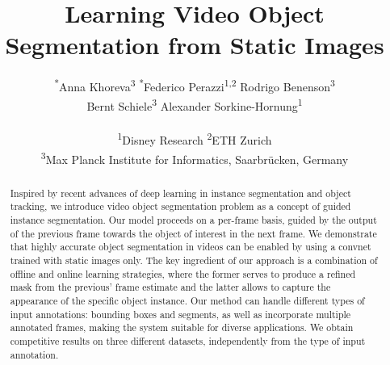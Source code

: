 \documentclass[10pt,twocolumn,letterpaper]{article}
\begin{document}
\title{Learning Video Object Segmentation from Static Images}







\author{
	\textsuperscript{*}Anna Khoreva\textsuperscript{3}\hspace{1.0em}
	\textsuperscript{*}Federico Perazzi\textsuperscript{1,2}\hspace{1.0em}
	Rodrigo Benenson\textsuperscript{3}\hspace{1.0em} \\
	Bernt Schiele\textsuperscript{3}\hspace{1.0em}
	Alexander Sorkine-Hornung\textsuperscript{1}
	\\\\
	\textsuperscript{1}Disney Research \hspace{1.0em} \textsuperscript{2}ETH Zurich\\
	\textsuperscript{3}Max Planck Institute for Informatics, Saarbr{\"u}cken, Germany\\
}

\maketitle
\vspace{-0.5em}




\begin{abstract}









Inspired by recent advances of deep learning in instance segmentation and object tracking, we introduce video object segmentation problem as a concept of guided instance segmentation.
Our model proceeds on a per-frame basis, guided by the output of the previous frame towards the object of interest in the next frame.
We demonstrate that highly accurate object segmentation in videos can be enabled by using a convnet trained with static images only.
The key ingredient of our approach is a combination of offline and online learning strategies, where the former serves
to produce a refined mask from the previous' frame estimate and the latter allows to capture the appearance of the specific object instance.
Our method can handle different types of input annotations: bounding boxes and segments, as well as
incorporate multiple annotated frames, making the system suitable for diverse applications.
We obtain competitive results on three different datasets, independently from the type of input annotation.
\end{abstract}
\renewcommand{\thefootnote}{\fnsymbol{footnote}}
\end{document}
